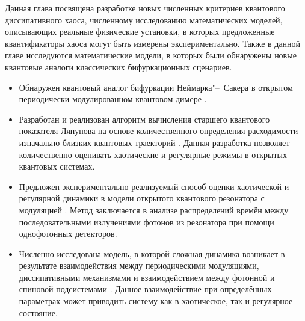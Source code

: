 Данная глава посвящена разработке новых численных критериев квантового диссипативного хаоса, численному исследованию математических моделей, описывающих реальные физические установки, в которых предложенные квантификаторы хаоса могут быть измерены экспериментально. 
Также в данной главе исследуются математические модели, в которых были обнаружены новые квантовые аналоги классических бифуркационных сценариев.
\begin{itemize}[beginpenalty=10000] %
	\item Обнаружен квантовый аналог бифуркации Неймарка"--~Сакера в открытом периодически модулированном квантовом димере \cite{Yusipov2019_1}.
	\item Разработан и реализован алгоритм вычисления старшего квантового показателя Ляпунова на основе количественного определения расходимости изначально близких квантовых траекторий \cite{Yusipov2019_2}. Данная разработка позволяет количественно оценивать хаотические и регулярные режимы в открытых квантовых системах.
	\item Предложен экспериментально реализуемый способ оценки хаотической и регулярной динамики в модели открытого квантового резонатора с модуляцией \cite{Yusipov2020}. Метод заключается в анализе распределений времён между последовательными излучениями фотонов из резонатора при помощи однофотонных детекторов. 
	\item Численно исследована модель, в которой сложная динамика возникает в результате взаимодействия между периодическими модуляциями, диссипативными механизмами и взаимодействием между фотонной и спиновой подсистемами \cite{Yusipov2021}. Данное взаимодействие при определённых параметрах может приводить систему как в хаотическое, так и регулярное состояние.
\end{itemize}



